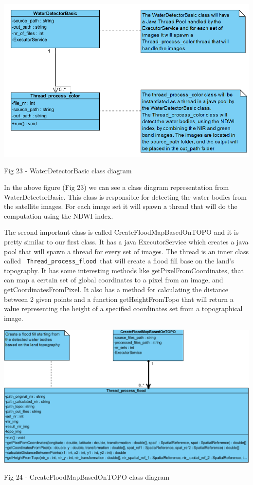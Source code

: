 \documentclass[12pt, a4paper]{report}
\begin{document}
\medskip
\includegraphics[scale=0.6, center]{WaterDetectorBasic_class.png}
\begin{center}
Fig 23 - WaterDetectorBasic class diagram
\end{center}
\par 

In the above figure (Fig 23) we can see a class diagram representation from WaterDetectorBasic. This class is responsible for detecting the water bodies from the satellite images. For each image set it will spawn a thread that will do the computation using the NDWI index.
\par 

The second important class is called CreateFloodMapBasedOnTOPO and it is pretty similar to our first class. It has a java ExecutorService which creates a java pool that will spawn a thread for every set of images. The thread is an inner class called \texttt{ Thread\_process\_flood }that will create a flood fill base on the land's topography. It has some interesting methods like getPixelFromCoordinates, that can map a certain set of global coordinates to a pixel from an image, and getCoordinatesFromPixel. It also has a method for calculating the distance between 2 given points and a function getHeightFromTopo that will return a value representing the height of a specified coordinates set from a topographical image.

\bigskip
\includegraphics[scale=0.55, center]{CreateFloodMapBasedOnTOPO_class.png}
\begin{center}
Fig 24 - CreateFloodMapBasedOnTOPO class diagram
\end{center}
\par 
\end{document}
